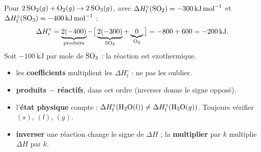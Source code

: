 \documentclass[11pt,a4paper]{article}
\begin{document}
\begin{exemplebox}
Pour $2\,\ce{SO2}(g) + \ce{O2}(g) \rightarrow 2\,\ce{SO3}(g)$, avec $\Delta H^\circ_{\text{f}}(\ce{SO2})=\qty{-300}{\kilo\joule\per\mol}$ et $\Delta H^\circ_{\text{f}}(\ce{SO3})=\qty{-400}{\kilo\joule\per\mol}$ :
\[ \Delta H^\circ_{\text{r}} = \underbrace{2(-400)}_{\text{produits}} - \big[\underbrace{2(-300)}_{\ce{SO2}} + \underbrace{0}_{\ce{O2}}\big] = -800 + 600 = \qty{-200}{\kilo\joule}. \]
Soit $\qty{-100}{\kilo\joule}$ par mole de $\ce{SO3}$ : la réaction est exothermique.
\end{exemplebox}

\begin{piege}[où l'on se trompe]
\begin{itemize}[leftmargin=1.6em,topsep=2pt,itemsep=2pt]
  \item les \textbf{coefficients} multiplient les $\Delta H^\circ_{\text{f}}$ : ne pas les oublier.
  \item \textbf{produits $-$ réactifs}, dans cet ordre (inverser donne le signe opposé).
  \item l'\textbf{état physique} compte : $\Delta H^\circ_{\text{f}}(\ce{H2O}(l))\ne\Delta H^\circ_{\text{f}}(\ce{H2O}(g))$. Toujours vérifier $(s)$, $(l)$, $(g)$.
  \item \textbf{inverser} une réaction change le signe de $\Delta H$ ; la \textbf{multiplier} par $k$ multiplie $\Delta H$ par $k$.
\end{itemize}
\end{piege}
\end{document}

